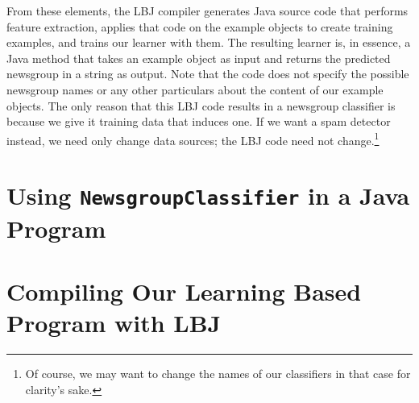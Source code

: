 From these elements, the LBJ compiler generates Java source code that performs
feature extraction, applies that code on the example objects to create
training examples, and trains our learner with them.  The resulting learner
is, in essence, a Java method that takes an example object as input and
returns the predicted newsgroup in a string as output.  Note that the code
does not specify the possible newsgroup names or any other particulars about
the content of our example objects.  The only reason that this LBJ code
results in a newsgroup classifier is because we give it training data that
induces one.  If we want a spam detector instead, we need only change data
sources; the LBJ code need not change.\footnote{Of course, we may want to
change the names of our classifiers in that case for clarity's sake.}


\section{Using {\tt NewsgroupClassifier} in a Java Program}

\section{Compiling Our Learning Based Program with LBJ}

